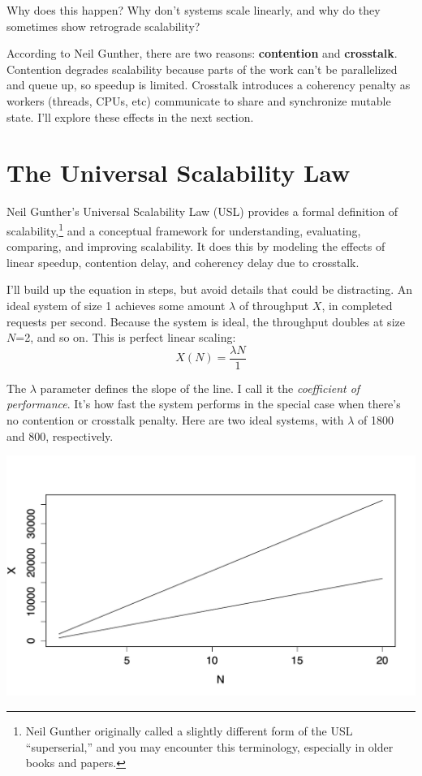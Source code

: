 \documentclass{vivid_layout}
\begin{document}
Why does this happen? Why don't systems scale linearly, and why do they
sometimes show retrograde scalability?

According to Neil Gunther, there are two reasons: {\bfseries contention} and
{\bfseries crosstalk}. Contention degrades scalability because parts of the work
can't be parallelized and queue up, so speedup is limited. Crosstalk introduces
a coherency penalty as workers (threads, CPUs, etc) communicate to share and
synchronize mutable state. I'll explore these effects in the next section.

\section{The Universal Scalability Law}

Neil Gunther's Universal Scalability Law (USL) provides a formal definition of
scalability,\footnote{Neil Gunther originally called a slightly different form
of the USL ``superserial,'' and you may encounter this terminology, especially
in older books and papers.} and a conceptual framework for understanding,
evaluating, comparing, and improving scalability. It does this by modeling
the effects of linear speedup, contention delay, and coherency delay due to
crosstalk.

I'll build up the equation in steps, but avoid details that could be
distracting. An ideal system of size 1 achieves some amount $\lambda$ of
throughput $X$, in completed requests per second. Because the system is ideal,
the throughput doubles at size $N$=2, and so on. This is perfect linear scaling:
\begin{equation}
X(N) = \frac{\lambda N}{1}
\label{linear}
\end{equation}

The $\lambda$ parameter defines the slope of the line. I call it the {\itshape
coefficient of performance}. It's how fast the system performs in the special
case when there's no contention or crosstalk penalty.  Here are two ideal
systems, with $\lambda$ of 1800 and 800, respectively.
\begin{center}
\includegraphics[width=.85\linewidth]{scalability/ideal-linear}
\end{center}
\end{document}
